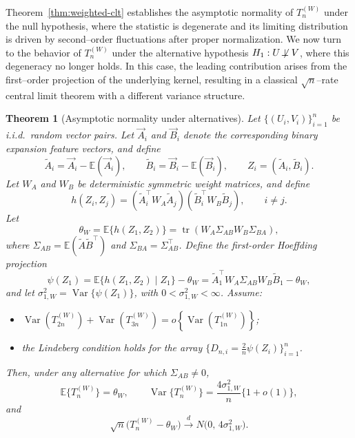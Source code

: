 \documentclass[12pt,reqno,oneside]{amsbook}
\newtheorem{theorem}{Theorem}[chapter]
\theoremstyle{definition}
\theoremstyle{remark}
\begin{document}
Theorem~\ref{thm:weighted-clt} establishes the asymptotic normality of
$T_n^{(W)}$ under the null hypothesis, where the statistic is degenerate and
its limiting distribution is driven by second--order fluctuations after
proper normalization. We now turn to the behavior of $T_n^{(W)}$ under the
alternative hypothesis $H_1:U\not\!\perp V$, where this degeneracy no longer
holds. In this case, the leading contribution arises from the first--order
projection of the underlying kernel, resulting in a classical $\sqrt{n}$--rate
central limit theorem with a different variance structure.


\begin{theorem}[Asymptotic normality under alternatives]
\label{thm:alt-clt}
Let $\{(U_i,V_i)\}_{i=1}^n$ be i.i.d.\ random vector pairs. Let
$\vec A_i$ and $\vec B_i$ denote the corresponding binary expansion feature
vectors, and define
\[
  \tilde A_i=\vec A_i-\mathbb E(\vec A_i),
  \qquad
  \tilde B_i=\vec B_i-\mathbb E(\vec B_i),
  \qquad
  Z_i=(\tilde A_i,\tilde B_i).
\]
Let $W_A$ and $W_B$ be deterministic symmetric weight matrices, and define
\[
  h(Z_i,Z_j)
  =
  (\tilde A_i^\top W_A\tilde A_j)
  (\tilde B_i^\top W_B\tilde B_j),
  \qquad i\ne j.
\]
Let
\[
  \theta_W
  =
  \mathbb E\{h(Z_1,Z_2)\}
  =
  \operatorname{tr}(W_A\Sigma_{AB}W_B\Sigma_{BA}),
\]
where $\Sigma_{AB}=\mathbb E(\tilde A\tilde B^\top)$ and
$\Sigma_{BA}=\Sigma_{AB}^\top$.
Define the first-order Hoeffding projection
\[
  \psi(Z_1)
  =
  \mathbb E\{h(Z_1,Z_2)\mid Z_1\}-\theta_W
  =
  \tilde A_1^\top W_A\Sigma_{AB}W_B\tilde B_1-\theta_W,
\]
and let $\sigma_{1,W}^2=\operatorname{Var}\{\psi(Z_1)\}$,
with $0<\sigma_{1,W}^2<\infty$. Assume:
\begin{itemize}
  \item[\upshape(A1)] $\operatorname{Var}(T_{2n}^{(W)})+\operatorname{Var}(T_{3n}^{(W)})
        = o\!\left\{\operatorname{Var}(T_{1n}^{(W)})\right\}$;
  \item[\upshape(A2)] the Lindeberg condition holds for the array
        $\bigl\{D_{n,i} = \tfrac{2}{n}\psi(Z_i)\bigr\}_{i=1}^n$.
\end{itemize}
Then, under any alternative for which $\Sigma_{AB}\ne 0$,
\[
  \mathbb E\{T_n^{(W)}\}=\theta_W,
  \qquad
  \operatorname{Var}\{T_n^{(W)}\}=\frac{4\sigma_{1,W}^2}{n}\{1+o(1)\},
\]
and
\[
  \sqrt{n}\bigl(T_n^{(W)}-\theta_W\bigr)
  \stackrel{d}{\longrightarrow}
  N\bigl(0,\,4\sigma_{1,W}^2\bigr).
\]
\end{theorem}
\end{document}
